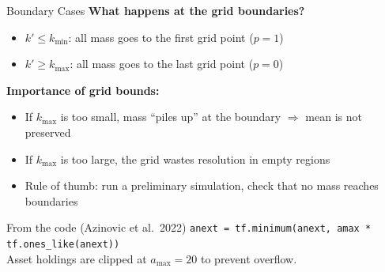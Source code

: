 \documentclass[aspectratio=169,11pt]{beamer}
\newcommand{\emphc}[1]{\textcolor{harvardcrimson}{#1}}
\begin{document}
\begin{frame}{Boundary Cases}
\textbf{What happens at the grid boundaries?}

\vspace{0.5em}
\begin{itemize}
    \item $k' \leq k_{\min}$: all mass goes to the \emphc{first grid point} ($p = 1$)
    \item $k' \geq k_{\max}$: all mass goes to the \emphc{last grid point} ($p = 0$)
\end{itemize}

\vspace{0.5em}
\textbf{Importance of grid bounds:}
\begin{itemize}
    \item If $k_{\max}$ is too small, mass ``piles up'' at the boundary $\Rightarrow$ \emphc{mean is not preserved}
    \item If $k_{\max}$ is too large, the grid wastes resolution in empty regions
    \item Rule of thumb: run a preliminary simulation, check that no mass reaches boundaries
\end{itemize}

\vspace{0.5em}
\begin{block}{From the code (Azinovic et al.\ 2022)}
\vspace{-0.2em}
\texttt{anext = tf.minimum(anext, amax * tf.ones\_like(anext))}\\[2pt]
{\small Asset holdings are clipped at $a_{\max} = 20$ to prevent overflow.}
\end{block}
\end{frame}
\end{document}
